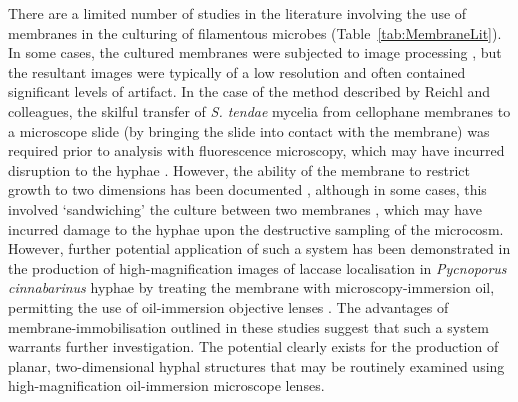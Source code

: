 There are a limited number of studies in the literature involving the use of membranes in the culturing of filamentous microbes (Table~\ref{tab:MembraneLit}). In some cases, the cultured membranes were subjected to image processing \cite{hitchcock1996,cross2004}, but the resultant images were typically of a low resolution and often contained significant levels of artifact. In the case of the method described by Reichl and colleagues, the skilful transfer of \emph{S. tendae} mycelia from cellophane membranes to a microscope slide (by bringing the slide into contact with the membrane) was required prior to analysis with fluorescence microscopy, which may have incurred disruption to the hyphae \cite{reichl1990}. However, the ability of the membrane to restrict growth to two dimensions has been documented \cite{hitchcock1996,jones1997,cross2004}, although in some cases, this involved \lq sandwiching' the culture between two membranes \cite{sone1999,cross2004}, which may have incurred damage to the hyphae upon the destructive sampling of the microcosm. However, further potential application of such a system has been demonstrated in the production of high-magnification images of laccase localisation in \emph{Pycnoporus cinnabarinus} hyphae by treating the membrane with microscopy-immersion oil, permitting the use of oil-immersion objective lenses \cite{jones1999}. The advantages of membrane-immobilisation outlined in these studies suggest that such a system warrants further investigation. The potential clearly exists for the production of planar, two-dimensional hyphal structures that may be routinely examined using high-magnification oil-immersion microscope lenses.

